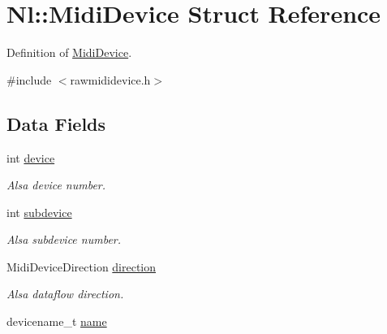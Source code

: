 \hypertarget{structNl_1_1MidiDevice}{}\section{Nl\+:\+:Midi\+Device Struct Reference}
\label{structNl_1_1MidiDevice}


Definition of \hyperlink{structNl_1_1MidiDevice}{Midi\+Device}.  




{\ttfamily \#include $<$rawmididevice.\+h$>$}

\subsection*{Data Fields}
\begin{DoxyCompactItemize}
\item 
\hypertarget{structNl_1_1MidiDevice_a56780d796fc967d4e3b42b17c7febb13}{}int \hyperlink{structNl_1_1MidiDevice_a56780d796fc967d4e3b42b17c7febb13}{device}\label{structNl_1_1MidiDevice_a56780d796fc967d4e3b42b17c7febb13}

\begin{DoxyCompactList}\small\item\em Alsa device number. \end{DoxyCompactList}\item 
\hypertarget{structNl_1_1MidiDevice_aa6221088ffc10c61a143482da8489e12}{}int \hyperlink{structNl_1_1MidiDevice_aa6221088ffc10c61a143482da8489e12}{subdevice}\label{structNl_1_1MidiDevice_aa6221088ffc10c61a143482da8489e12}

\begin{DoxyCompactList}\small\item\em Alsa subdevice number. \end{DoxyCompactList}\item 
\hypertarget{structNl_1_1MidiDevice_ac9cd32f4346281d2d8fcf2abbbaae8b6}{}Midi\+Device\+Direction \hyperlink{structNl_1_1MidiDevice_ac9cd32f4346281d2d8fcf2abbbaae8b6}{direction}\label{structNl_1_1MidiDevice_ac9cd32f4346281d2d8fcf2abbbaae8b6}

\begin{DoxyCompactList}\small\item\em Alsa dataflow direction. \end{DoxyCompactList}\item 
\hypertarget{structNl_1_1MidiDevice_a52238e82fdc95a65d743348e19f1f12e}{}devicename\+\_\+t \hyperlink{structNl_1_1MidiDevice_a52238e82fdc95a65d743348e19f1f12e}{name}\label{structNl_1_1MidiDevice_a52238e82fdc95a65d743348e19f1f12e}


\end{DoxyCompactItemize}
